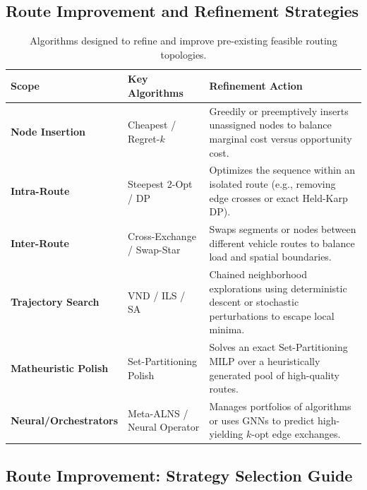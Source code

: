 \documentclass{article}
\begin{document}

\subsection*{Route Improvement and Refinement Strategies}

\begin{table}[H]
    \centering
    \caption{Algorithms designed to refine and improve pre-existing feasible routing topologies.}
    \begin{tabularx}{\textwidth}{@{} l l X @{}}
        \toprule
        \textbf{Scope} & \textbf{Key Algorithms} & \textbf{Refinement Action} \\
        \midrule
        \textbf{Node Insertion} & Cheapest / Regret-$k$ & Greedily or preemptively inserts unassigned nodes to balance marginal cost versus opportunity cost. \\
        \textbf{Intra-Route} & Steepest 2-Opt / DP & Optimizes the sequence within an isolated route (e.g., removing edge crosses or exact Held-Karp DP). \\
        \textbf{Inter-Route} & Cross-Exchange / Swap-Star & Swaps segments or nodes between different vehicle routes to balance load and spatial boundaries. \\
        \textbf{Trajectory Search} & VND / ILS / SA & Chained neighborhood explorations using deterministic descent or stochastic perturbations to escape local minima. \\
        \textbf{Matheuristic Polish}& Set-Partitioning Polish & Solves an exact Set-Partitioning MILP over a heuristically generated pool of high-quality routes. \\
        \textbf{Neural/Orchestrators}& Meta-ALNS / Neural Operator & Manages portfolios of algorithms or uses GNNs to predict high-yielding $k$-opt edge exchanges. \\
        \bottomrule
    \end{tabularx}
\end{table}

\subsection*{Route Improvement: Strategy Selection Guide}
\end{document}
